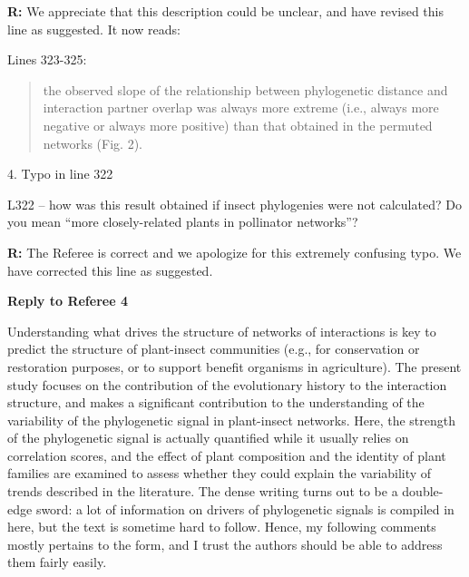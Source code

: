 \documentclass[12pt]{letter}
\newenvironment{refquote}{\bigskip \begin{it}}{\end{it}\smallskip}
\begin{document}
		\textbf{R:} We appreciate that this description could be unclear, and have revised this line as suggested. It now reads:

		Lines 323-325:

		\begin{quotation}

			the observed 
			slope of the relationship between phylogenetic distance and interaction 
			partner overlap was always more extreme (i.e., always more negative or 
			always more positive) than that obtained in the permuted networks (Fig. 2).

	    \end{quotation}


	4. Typo in line 322 
		
		\begin{refquote}
			L322 – how was this result obtained if insect phylogenies were not calculated? Do you mean “more closely-related plants in pollinator networks”?
		\end{refquote}


		\textbf{R:} The Referee is correct and we apologize for this extremely confusing typo. We have corrected this line as suggested.


\clearpage


{\Large \bf Reply to Referee 4} 

	\begin{refquote}
		Understanding what drives the structure of networks of interactions is key to predict the structure of plant-insect communities (e.g., for conservation or restoration purposes, or to support benefit organisms in agriculture).
		The present study focuses on the contribution of the evolutionary history to the interaction structure, and makes a significant contribution to the understanding of the variability of the phylogenetic signal in plant-insect networks. Here, the strength of the phylogenetic signal is actually quantified while it usually relies on correlation scores, and the effect of plant composition and the identity of plant families are examined to assess whether they could explain the variability of trends described in the literature.
		The dense writing turns out to be a double-edge sword: a lot of information on drivers of phylogenetic signals is compiled in here, but the text is sometime hard to follow. Hence, my following comments mostly pertains to the form, and I trust the authors should be able to address them fairly easily.
	\end{refquote}
\end{document}
